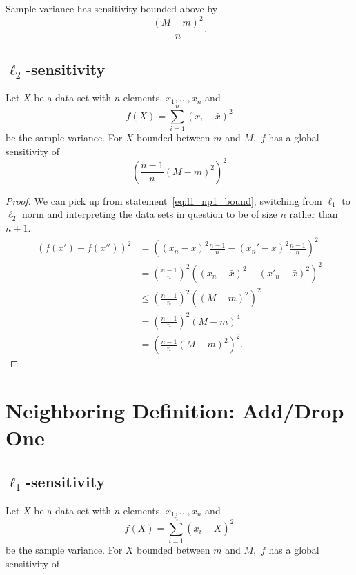 \documentclass[11pt]{scrartcl} %
\begin{document}
\begin{corollary}
Sample variance has sensitivity bounded above by
$$ \frac{(M-m)^2 }{n}. $$
\end{corollary}

\subsection{$\ell_2$-sensitivity}
\begin{theorem}
	Let $X$ be a data set with $n$ elements, $x_1, \hdots, x_n$ and
	\[ f(X) = \sum_{i=1}^n (x_i - \bar{x})^2 \]
	be the sample variance.
	For $X$ bounded between $m$ and $M,$ $f$ has a global sensitivity of
	\[ \left( \frac{n-1}{n} (M-m)^2 \right)^2 \]
\end{theorem}

\begin{proof}
	We can pick up from statement~\ref{eq:l1_np1_bound}, switching from $\ell_1$ to $\ell_2$ norm and interpreting
	the data sets in question to be of size $n$ rather than $n+1$.
	\begin{align*}
		(f(x') - f(x''))^2
			&= \left( (x_{n}-\bar{x})^2 \frac{n-1}{n} - (x_{n}'-\bar{x})^2 \frac{n-1}{n} \right)^2 \\
			&= \left( \frac{n-1}{n} \right)^2 \left( (x_n - \bar{x})^2 - (x'_n - \bar{x})^2 \right)^2 \\
			&\leq \left( \frac{n-1}{n} \right)^2 \left( (M-m)^2 \right)^2 \\
			&= \left( \frac{n-1}{n} \right)^2 (M - m)^4 \\
			&= \left( \frac{n-1}{n} (M - m)^2 \right)^2.
	\end{align*}
\end{proof}

\section{Neighboring Definition: Add/Drop One}
\subsection{$\ell_1$-sensitivity}
 \begin{theorem}
 	Let $X$ be a data set with $n$ elements, $x_1, \hdots, x_n$ and
 	\[ f(X) = \sum_{i=1}^n (x_i - \bar{X})^2 \]
 	be the sample variance.
 	For $X$ bounded between $m$ and $M,$ $f$ has a global sensitivity of
 \end{theorem}
\end{document}
